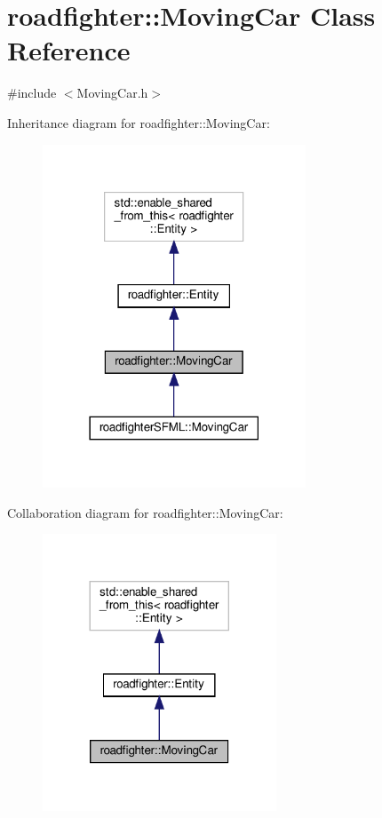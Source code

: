 \hypertarget{classroadfighter_1_1MovingCar}{}\section{roadfighter\+:\+:Moving\+Car Class Reference}
\label{classroadfighter_1_1MovingCar}


{\ttfamily \#include $<$Moving\+Car.\+h$>$}



Inheritance diagram for roadfighter\+:\+:Moving\+Car\+:\nopagebreak
\begin{figure}[H]
\begin{center}
\leavevmode
\includegraphics[width=222pt]{classroadfighter_1_1MovingCar__inherit__graph}
\end{center}
\end{figure}


Collaboration diagram for roadfighter\+:\+:Moving\+Car\+:\nopagebreak
\begin{figure}[H]
\begin{center}
\leavevmode
\includegraphics[width=197pt]{classroadfighter_1_1MovingCar__coll__graph}
\end{center}
\end{figure}
